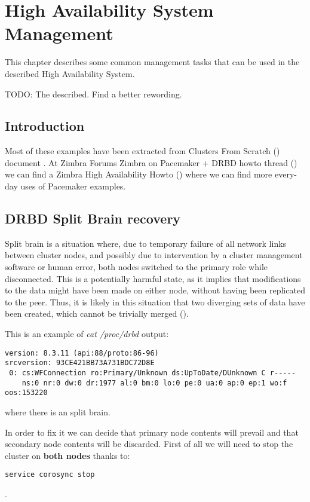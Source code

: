 

\chapter{High Availability System Management}
\label{chap:ha-system-management}
This chapter describes some common management tasks that can be used in the described High Availability System.

TODO: The described. Find a better rewording.

\section {Introduction}
Most of these examples have been extracted from Clusters From Scratch (\cite{ClustersFromScratch}) document . At Zimbra Forums Zimbra on Pacemaker + DRBD howto thread (\cite{ZForumsTaer}) we can find a Zimbra High Availability Howto (\cite{TaerHowtoHAZimbra8}) where we can find more every-day uses of Pacemaker examples.

\section {DRBD Split Brain recovery}

Split brain is a situation where, due to temporary failure of all network links between cluster nodes, and possibly due to intervention by a cluster management software or human error, both nodes switched to the primary role while disconnected. This is a potentially harmful state, as it implies that modifications to the data might have been made on either node, without having been replicated to the peer. Thus, it is likely in this situation that two diverging sets of data have been created, which cannot be trivially merged (\cite{DrbdSplitBrain}).

This is an example of \textit{cat /proc/drbd} output:
\begin{verbatim}
version: 8.3.11 (api:88/proto:86-96)
srcversion: 93CE421BB73A731BDC72D8E 
 0: cs:WFConnection ro:Primary/Unknown ds:UpToDate/DUnknown C r-----
    ns:0 nr:0 dw:0 dr:1977 al:0 bm:0 lo:0 pe:0 ua:0 ap:0 ep:1 wo:f oos:153220
\end{verbatim}
where there is an split brain.

In order to fix it we can decide that primary node contents will prevail and that secondary node contents will be discarded. First of all we will need to stop the cluster on \textbf{both nodes} thanks to:
\begin{verbatim}
service corosync stop
\end{verbatim}
.

